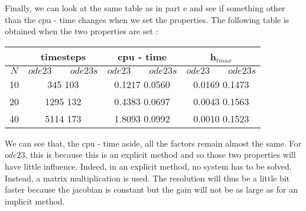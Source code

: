 Finally, we can look at the same table as in part e and see if something other than the cpu - time changes when we set the properties. The following table is obtained when the two properties are set : 

\begin{center}
\begin{tabular}{|c|c|c|c|}
\hline 
  & \textbf{timesteps} & \textbf{cpu - time} & \textbf{h}$_{tmax}$ \\ 
\hline 
$N$ & $ode23 \phantom{fedz} ode23s$ & $ode23 \phantom{fedz} ode23s$ & $ode23 \phantom{fedz} ode23s$ \\ 
\hline 
10 &345 \phantom{fedzf} 103  & 0.1217 \phantom{fedz}    0.0560 &  0.0169  \phantom{fedz}  0.1473 \\ 
\hline 
20 & 1295 \phantom{fedz} 132 & 0.4383  \phantom{fedz}   0.0697 & 0.0043  \phantom{fedz}  0.1563 \\ 
\hline 
40 & 5114 \phantom{fedz} 173 &1.8093 \phantom{fedz}   0.0992  & 0.0010  \phantom{fedz}  0.1523 \\ 
\hline 
\end{tabular} 
\end{center}

We can see that, the cpu - time aside, all the factors remain almost the same. For $ode23$, this is because this is an explicit method and so those two properties will have little influence. Indeed, in an explicit method, no system has to be solved. Instead, a matrix multiplication is used. The resolution will thus be a little bit faster because the jacobian is constant but the gain will not be as large as for an implicit method. 